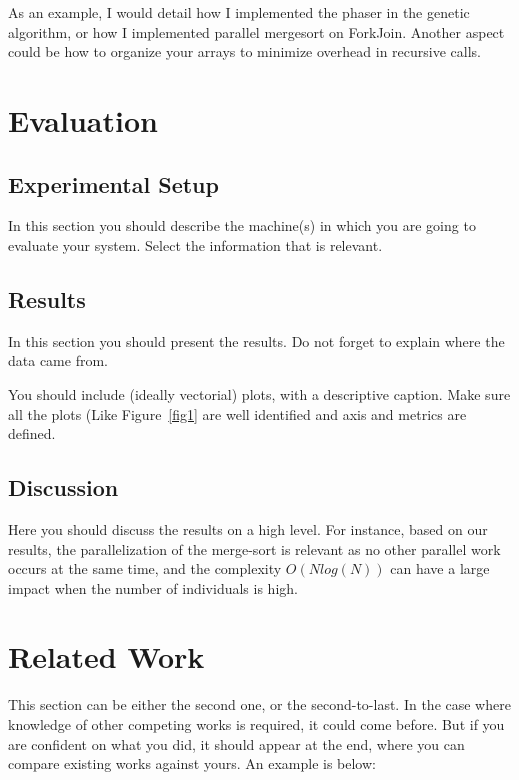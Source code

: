 \documentclass[runningheads]{llncs}
\begin{document}
As an example, I would detail how I implemented the phaser in the genetic algorithm, or how I implemented parallel mergesort on ForkJoin. Another aspect could be how to organize your arrays to minimize overhead in recursive calls.


\section{Evaluation}

\subsection{Experimental Setup}

In this section you should describe the machine(s) in which you are going to evaluate your system. Select the information that is relevant.


\subsection{Results}

In this section you should present the results. Do not forget to explain where the data came from. 

You should include (ideally vectorial) plots, with a descriptive caption. Make sure all the plots (Like Figure~\ref{fig1} are well identified and axis and metrics are defined.

\subsection{Discussion}

Here you should discuss the results on a high level. For instance, based on our results, the parallelization of the merge-sort is relevant as no other parallel work occurs at the same time, and the complexity $O(N log(N))$ can have a large impact when the number of individuals is high.

\section{Related Work}

This section can be either the second one, or the second-to-last. In the case where knowledge of other competing works is required, it could come before. But if you are confident on what you did, it should appear at the end, where you can compare existing works against yours. An example is below:
\end{document}
